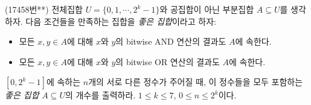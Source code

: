 \begin{problem}
    (17458번**) 전체집합 $U = \{ 0, 1, \cdots, 2^k-1 \}$와 공집합이 아닌 부분집합 $A \subseteq U$를 생각하자. 다음 조건들을 만족하는 집합을 \textit{좋은 집합}이라고 하자:
    \begin{itemize}
        \item 모든 $x, y \in A$에 대해 $x$와 $y$의 bitwise AND 연산의 결과도 $A$에 속한다.
        \item 모든 $x, y \in A$에 대해 $x$와 $y$의 bitwise OR 연산의 결과도 $A$에 속한다.
    \end{itemize}
    $[0, 2^k-1]$에 속하는 $n$개의 서로 다른 정수가 주어질 때, 이 정수들을 모두 포함하는 \textit{좋은 집합} $A \subseteq U$의 개수를 출력하라. $1 \leq k \leq 7$, $0 \leq n \leq 2^k$이다.
\end{problem}

